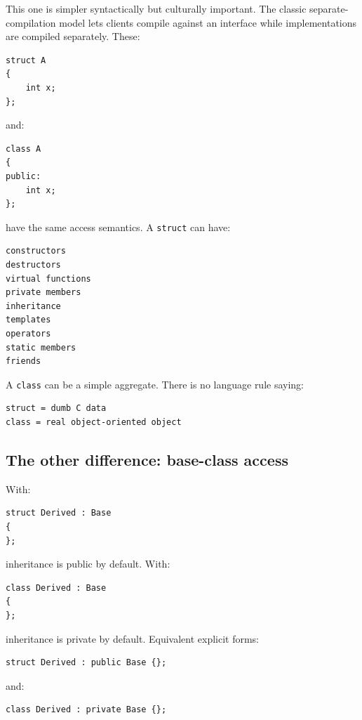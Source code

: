 This one is simpler syntactically but culturally important. The classic separate-compilation model lets clients compile against an interface while implementations are compiled separately. These:

\begin{verbatim}
struct A
{
    int x;
};
\end{verbatim}

and:

\begin{verbatim}
class A
{
public:
    int x;
};
\end{verbatim}

have the same access semantics. A \texttt{struct} can have:

\begin{verbatim}
constructors
destructors
virtual functions
private members
inheritance
templates
operators
static members
friends
\end{verbatim}

A \texttt{class} can be a simple aggregate. There is no language rule saying:

\begin{verbatim}
struct = dumb C data
class = real object-oriented object
\end{verbatim}

\subsection{The other difference: base-class access}\label{01-foundations-i-ch003-the-other-difference-base-class-access}

With:

\begin{verbatim}
struct Derived : Base
{
};
\end{verbatim}

inheritance is public by default. With:

\begin{verbatim}
class Derived : Base
{
};
\end{verbatim}

inheritance is private by default. Equivalent explicit forms:

\begin{verbatim}
struct Derived : public Base {};
\end{verbatim}

and:

\begin{verbatim}
class Derived : private Base {};
\end{verbatim}

